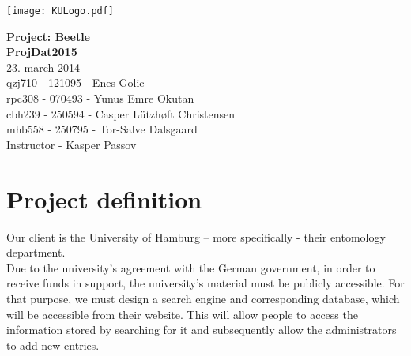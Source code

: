 \documentclass[12pt,a4paper]{article}
\begin{document}
	
	\begin{minipage}[b]{1.0\linewidth} 
		\texttt{[image: KULogo.pdf]}
		
		\vspace*{-16ex}
		\vspace {35ex}
		\begin{center}
			{\huge \bf Project: Beetle} \vspace*{4ex} \\
			{\huge \bf ProjDat2015}  \\
			{\large 23. march 2014}\\
			\vspace*{2ex}
			qzj710 - 121095 - Enes Golic \\
			rpc308 - 070493 - Yunus Emre Okutan \\
			cbh239 - 250594 - Casper Lützhøft Christensen \\
			mhb558 - 250795 - Tor-Salve Dalsgaard\\
			\vspace*{1ex}
			Instructor - Kasper Passov
			
		\end{center}
	\end{minipage}
	
\newpage
\tableofcontents
\newpage
\section{Project definition}
Our client is the University of Hamburg – more specifically - their entomology department.\\
Due to the university’s agreement with the German government, in order to receive funds in support, the university’s material must be publicly accessible. For that purpose, we must design a search engine and corresponding database, which will be accessible from their website. This will allow people to access the information stored by searching for it and subsequently allow the administrators to add new entries.\\ 
\end{document}
